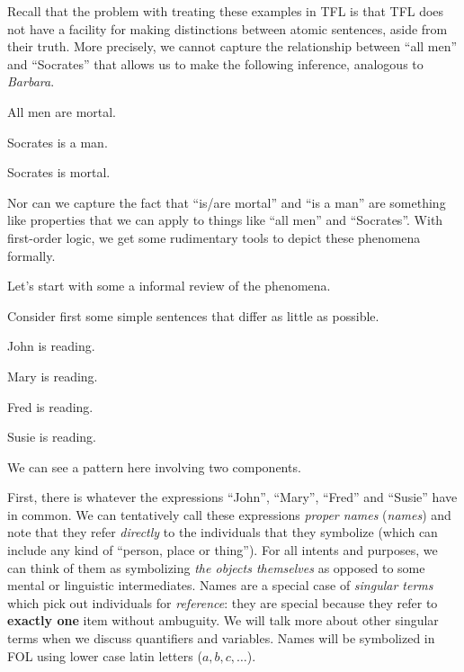 Recall that the problem with treating these examples in TFL is that TFL does not
have a facility for making distinctions between atomic sentences, aside from
their truth. More precisely, we cannot capture the relationship between ``all
men'' and ``Socrates'' that allows us to make the following inference, analogous
to \emph{Barbara}.

\begin{argument}
\item[ ] All men are mortal. 
\item[ ] Socrates is a man.
\item[\therefore] Socrates is mortal.
\end{argument}

Nor can we capture the fact that ``is/are mortal'' and ``is a man'' are
something like properties that we can apply to things like ``all men'' and
``Socrates''. With first-order logic, we get some rudimentary tools to depict
these phenomena formally.

Let's start with some a informal review of the phenomena.

Consider first some simple sentences that differ as little as possible.

\begin{argument}
\item[ ] John is reading.
\item[ ] Mary is reading.
\item[ ] Fred is reading.
\item[ ] Susie is reading.
\end{argument}

We can see a pattern here involving two components.

First, there is whatever the expressions ``John'', ``Mary'', ``Fred'' and
``Susie'' have in common. We can tentatively call these expressions \emph{proper
names} (\emph{names}) and note that they refer \emph{directly} to the
individuals that they symbolize (which can include any kind of ``person, place
or thing''). For all intents and purposes, we can think of them as symbolizing
\emph{the objects themselves} as opposed to some mental or linguistic
intermediates. Names are a special case of \emph{singular terms} which pick out
individuals for \emph{reference}: they are special because they refer to
\textbf{exactly one} item without ambuguity. We will talk more about other
singular terms when we discuss quantifiers and variables. Names will be
symbolized in FOL using lower case latin letters ($a,b,c,\dots$).

